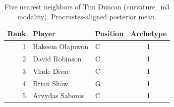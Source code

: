 \begin{table}[htbp]
  \centering\small
  \begin{tabular}{rllc}
    \toprule
    Rank & Player & Position & Archetype \\
    \midrule
    1 & Hakeem Olajuwon & C & 1 \\
    2 & David Robinson & C & 1 \\
    3 & Vlade Divac & C & 1 \\
    4 & Brian Shaw & G & 1 \\
    5 & Arvydas Sabonis & C & 1 \\
    \bottomrule
  \end{tabular}
  \caption{Five nearest neighbors of Tim Duncan (curvature_m3 modality), Procrustes-aligned posterior mean.}
  \label{tab:Tim_Duncan_neighbors_curvature_m3}
\end{table}

